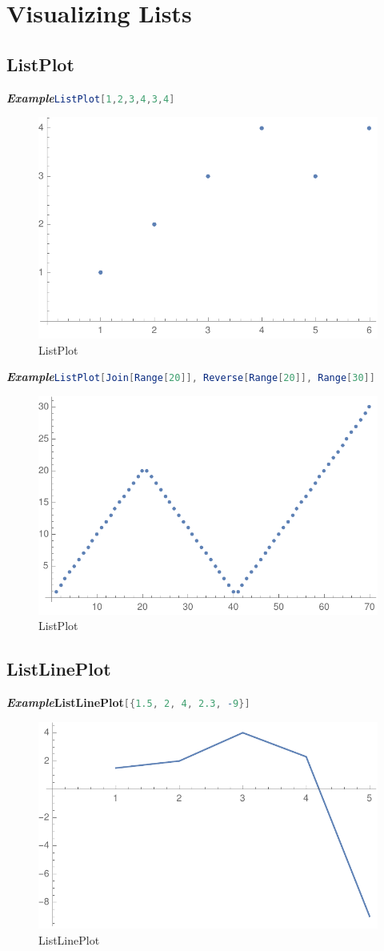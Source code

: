 \documentclass[a4paper]{book}
\begin{document}
\section{Visualizing Lists}

\subsection{ListPlot}

\emph{\textbf{Example}}\quad\lstinline[language=Mathematica]|ListPlot[1,2,3,4,3,4]|
\begin{figure}[H]
  \centering
  \includegraphics[width=0.45\linewidth]{figures/ListPlot}
  \caption{ListPlot}
\end{figure}



\noindent\emph{\textbf{Example}}\quad\lstinline[language=Mathematica]|ListPlot[Join[Range[20]], Reverse[Range[20]], Range[30]]|

\begin{figure}[H]
  \centering
  \includegraphics[width=0.45\linewidth]{figures/ListPlot2}
  \caption{ListPlot}
\end{figure}


\subsection{ListLinePlot}
\label{subsec:label}
\noindent\emph{\textbf{Example}}\quad\textbf{ListLinePlot}\lstinline[language=Mathematica]|[{1.5, 2, 4, 2.3, -9}]|
\begin{figure}[H]
  \centering
  \includegraphics[width=0.45\linewidth]{figures/ListLinePlot.pdf}
  \caption{ListLinePlot}
\end{figure}
\end{document}
